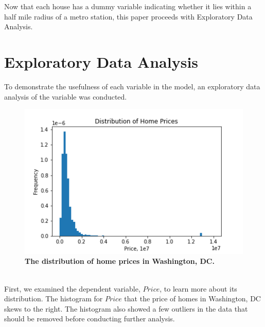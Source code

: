 \documentclass[12pt]{report}
\begin{document}
Now that each house has a dummy variable indicating whether it lies within a half mile radius of a metro station, this paper proceeds with Exploratory Data Analysis. 
\clearpage

\section*{Exploratory Data Analysis}
To demonstrate the usefulness of each variable in the model, an exploratory data analysis of the variable was conducted. 
\begin{figure}[h]
\begin{center}
\includegraphics[width=130mm]{priceHist.png}
\end{center}
\caption{\textbf{The distribution of home prices in Washington, DC.}}
\label{fig:priceHist}
\end{figure}
\\
First, we examined the dependent variable, $Price$, to learn more about its distribution. The histogram for $Price$ that the price of homes in Washington, DC skews to the right. The histogram also showed a few outliers in the data that should be removed before conducting further analysis. 
\end{document}
